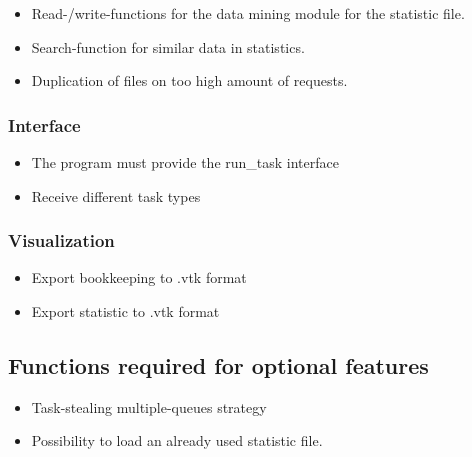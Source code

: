 {			%
			\begin{itemize}
				
				\item Read-/write-functions for the data mining module for the statistic file.
				\item Search-function for similar data in statistics.
				\item Duplication of files on too high amount of requests.
			\end{itemize}
	
	
	\subsubsection{Interface}
	
		\begin{itemize}
			\item The program must provide the run\_task interface
			\item Receive different task types
		\end{itemize}
		
		
	\subsubsection{Visualization}
	
		\begin{itemize}
			\item Export bookkeeping to .vtk format
			\item Export statistic to .vtk format
		\end{itemize}
		
	\subsection{Functions required for optional features}
	
		\begin{itemize}
			\item Task-stealing multiple-queues strategy%
			\item Possibility to load an already used statistic file.%
		\end{itemize}
}
